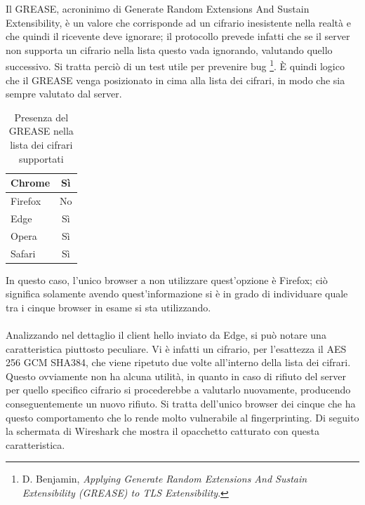 Il GREASE,  acroninimo di Generate Random Extensions And Sustain Extensibility, è un valore che corrisponde ad un cifrario inesistente nella realtà e che quindi il ricevente deve ignorare; il protocollo prevede infatti che se il server non supporta un cifrario nella lista questo vada ignorando, valutando quello successivo. Si tratta perciò di un test utile per prevenire bug \footnote{D. Benjamin, \textit{Applying Generate Random Extensions And Sustain Extensibility (GREASE) to TLS Extensibility}.}.
È quindi logico che il GREASE venga posizionato in cima alla lista dei cifrari, in modo che sia sempre valutato dal server.
\\
\begin{table}[H]
	\centering
	\begin{tabular}{| l | c |}
			\hline
		\rowcolor[HTML]{FDD20A}Chrome & Sì
		\\
		\hline
		\rowcolor[HTML]{FF9500}Firefox & No
		\\
		\hline
		\rowcolor[HTML]{3277BC}Edge & Sì
		\\
		\hline
		\rowcolor[HTML]{CB0B1E}Opera & Sì
		\\
		\hline
		\rowcolor[HTML]{0FB5EE} Safari & Sì
		\\
		\hline
	\end{tabular}
	\caption{Presenza del GREASE nella lista dei cifrari supportati}
	\label{tab:grease}
\end{table}

In questo caso, l'unico browser a non utilizzare quest'opzione è Firefox; ciò significa solamente avendo quest'informazione si è in grado di individuare quale tra i cinque browser in esame si sta utilizzando.
\\ \\
Analizzando nel dettaglio il client hello inviato da Edge, si può notare una caratteristica piuttosto peculiare. Vi è infatti un cifrario, per l'esattezza il AES 256 GCM SHA384, che viene ripetuto due volte all'interno della lista dei cifrari. Questo ovviamente non ha alcuna utilità, in quanto in caso di rifiuto del server per quello specifico cifrario si procederebbe a valutarlo nuovamente, producendo conseguentemente un nuovo rifiuto. Si tratta dell'unico browser dei cinque che ha questo comportamento che lo rende molto vulnerabile al fingerprinting.
Di seguito la schermata di Wireshark che mostra il opacchetto catturato con questa caratteristica.

